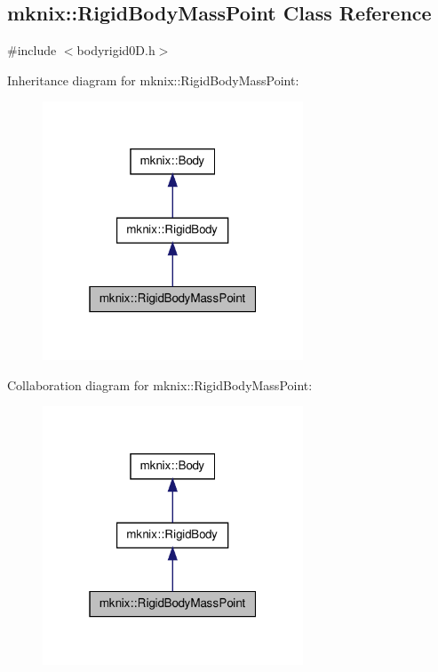 \hypertarget{classmknix_1_1_rigid_body_mass_point}{\subsection{mknix\-:\-:Rigid\-Body\-Mass\-Point Class Reference}
\label{classmknix_1_1_rigid_body_mass_point}
}


{\ttfamily \#include $<$bodyrigid0\-D.\-h$>$}



Inheritance diagram for mknix\-:\-:Rigid\-Body\-Mass\-Point\-:\nopagebreak
\begin{figure}[H]
\begin{center}
\leavevmode
\includegraphics[width=220pt]{d0/d7e/classmknix_1_1_rigid_body_mass_point__inherit__graph}
\end{center}
\end{figure}


Collaboration diagram for mknix\-:\-:Rigid\-Body\-Mass\-Point\-:\nopagebreak
\begin{figure}[H]
\begin{center}
\leavevmode
\includegraphics[width=220pt]{d4/d64/classmknix_1_1_rigid_body_mass_point__coll__graph}
\end{center}
\end{figure}
